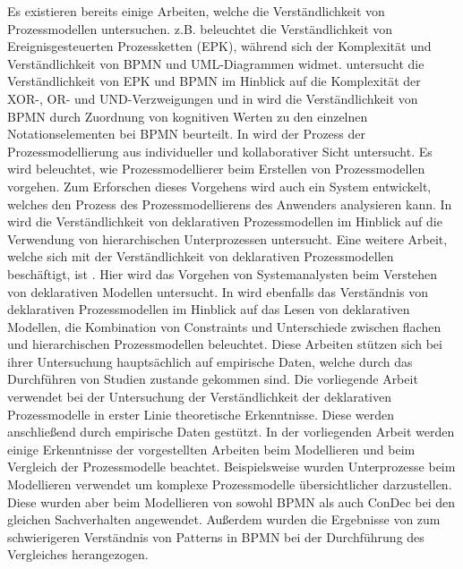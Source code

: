 Es existieren bereits einige Arbeiten, welche die Verständlichkeit von Prozessmodellen untersuchen. \cite{bpm07} z.B. beleuchtet die Verständlichkeit von Ereignisgesteuerten Prozessketten (EPK), während sich \cite{gruhn2006complexity} der Komplexität und Verständlichkeit von BPMN und UML-Diagrammen widmet. \cite{reijers2011study} untersucht die Verständlichkeit von EPK und BPMN im Hinblick auf die Komplexität der XOR-, OR- und UND-Verzweigungen und in \cite{gruhn2006adopting} wird die Verständlichkeit von BPMN durch Zuordnung von kognitiven Werten zu den einzelnen Notationselementen bei BPMN beurteilt. \newline
In \cite{pinggera2012tracing, forster2012collaborative, pinggera2010investigating} wird der Prozess der Prozessmodellierung aus individueller und kollaborativer Sicht untersucht. Es wird beleuchtet, wie Prozessmodellierer beim Erstellen von Prozessmodellen vorgehen. Zum Erforschen dieses Vorgehens wird auch ein System entwickelt, welches den Prozess des Prozessmodellierens des Anwenders analysieren kann. \newline
In \cite{sabrina942} wird die Verständlichkeit von deklarativen Prozessmodellen im Hinblick auf die Verwendung von hierarchischen Unterprozessen untersucht. Eine weitere Arbeit, welche sich mit der Verständlichkeit von deklarativen Prozessmodellen beschäftigt, ist \cite{haisjackl2014understanding}. Hier wird das Vorgehen von Systemanalysten beim Verstehen von deklarativen Modellen untersucht. In \cite{sabrina933} wird ebenfalls das Verständnis von deklarativen Prozessmodellen im Hinblick auf das Lesen von deklarativen Modellen, die Kombination von Constraints und Unterschiede zwischen flachen und hierarchischen Prozessmodellen beleuchtet. Diese Arbeiten stützen sich bei ihrer Untersuchung hauptsächlich auf empirische Daten, welche durch das Durchführen von Studien zustande gekommen sind. Die vorliegende Arbeit verwendet bei der Untersuchung der Verständlichkeit der deklarativen Prozessmodelle in erster Linie theoretische Erkenntnisse. Diese werden anschließend durch empirische Daten gestützt. \newline
In der vorliegenden Arbeit werden einige Erkenntnisse der vorgestellten Arbeiten beim Modellieren und beim Vergleich der Prozessmodelle beachtet. Beispielsweise wurden Unterprozesse beim  Modellieren verwendet um komplexe Prozessmodelle übersichtlicher darzustellen. Diese wurden aber beim Modellieren von sowohl BPMN als auch ConDec bei den gleichen Sachverhalten angewendet.\newline
Außerdem wurden die Ergebnisse von \cite{gruhn2006adopting} zum schwierigeren Verständnis von Patterns in BPMN bei der Durchführung des Vergleiches herangezogen.\newline
